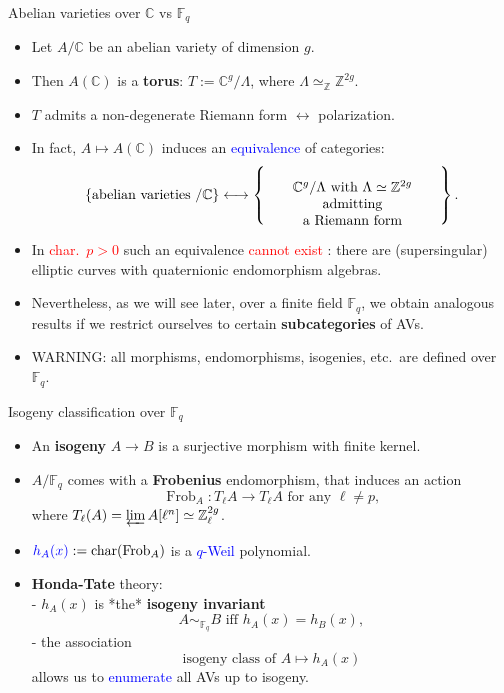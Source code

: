 \documentclass[usenames,dvipsnames,handout]{beamer}
\def\Z{\mathbb{Z}}
\def\C{\mathbb{C}}
\def\F{\mathbb{F}}
\DeclareMathOperator{\Char}{char}
\DeclareMathOperator{\Frob}{Frob}
\newcommand{\set}[1]{\left\lbrace#1\right\rbrace }
\newcommand{\red}[1]{\textcolor{red}{#1}}
\newcommand{\blue}[1]{\textcolor{blue}{#1}}
\begin{document}
\begin{frame}{ Abelian varieties over $\C$ vs $\F_q$ }    
    \begin{itemize}
     \item Let $A/\C$ be an abelian variety of dimension $g$. 
\pause
    \item Then $A(\C)$ is a {\bf torus}: $T:=\C^g/\Lambda$, where $\Lambda\simeq_\Z\Z^{2g}$.
\pause 
    \item $T$ admits a non-degenerate Riemann form $\longleftrightarrow$ polarization.
\pause
    \item In fact, $ A \mapsto A(\C)$ induces an \blue{equivalence} of categories:
    \vspace{-.2cm}
	  \[
      \set{ \text{abelian varieties $/\C$} } \longleftrightarrow 
      \set{\parbox[c]{12.5em}{\center $\C^g/\Lambda$ with $\Lambda\simeq \Z^{2g}$ admitting\\ a Riemann form}}.
     \]
\pause
    \vspace{-.5cm}
    \item In \red{char.~$p>0$} such an equivalence \red{cannot exist} : there are (supersingular) elliptic curves with quaternionic endomorphism algebras.
\pause 
    \item Nevertheless, as we will see later, over a finite field $\F_q$, we obtain analogous results if we restrict ourselves to certain {\bf subcategories} of AVs.
\pause
    \item WARNING: all morphisms, endomorphisms, isogenies, etc.~are defined over $\F_q$.
	\end{itemize}
\end{frame}

\begin{frame}{ Isogeny classification over $\F_q$}
	\begin{itemize}
    \item An {\bf isogeny} $A\to B$ is a surjective morphism with finite kernel.
\pause     
    \item $A/\F_{q}$ comes with a {\bf Frobenius} endomorphism, 
\pause
    that induces an action
		\[ \Frob_A : T_\ell A \rightarrow T_\ell A \text{ for any }\ell\neq p, \]
		where $T_\ell(A) = \varprojlim A[\ell^n] \simeq \Z_\ell^{2g}$.
\pause
    \item $\blue{h_A(x)}:=\Char(\Frob_A)$ is a \blue{$q$-Weil} polynomial.
\pause
    \item {\bf Honda-Tate} theory:\\
        - $h_A(x)$ is *the* {\bf isogeny invariant} 
        \[ A\sim_{\F_q} B \text{ iff } h_A(x) = h_B(x), \]
\pause
        - the association
		\[ \text{isogeny class of }A \longmapsto h_A(x) \]
		allows us to \blue{enumerate} all AVs up to isogeny.
	\end{itemize}
\end{frame}
\end{document}
